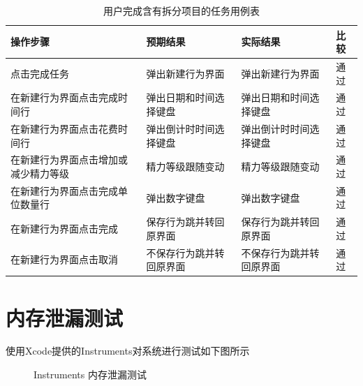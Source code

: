 \begin{table}[H]
	\centering
	\caption{用户完成含有拆分项目的任务用例表}
	\begin{tabular}{p{3cm}p{3cm}p{3cm}p{3cm}} \toprule
	  操作步骤 & 预期结果 & 实际结果 & 比较 \\
	  \midrule
	  点击完成任务 & 弹出新建行为界面 & 弹出新建行为界面 & 通过 \\ \midrule
	  在新建行为界面点击完成时间行 & 弹出日期和时间选择键盘 & 弹出日期和时间选择键盘 & 通过 \\ \midrule
	  在新建行为界面点击花费时间行 & 弹出倒计时时间选择键盘 & 弹出倒计时时间选择键盘 & 通过 \\ \midrule
	  在新建行为界面点击增加或减少精力等级 & 精力等级跟随变动 & 精力等级跟随变动 & 通过 \\ \midrule
	  在新建行为界面点击完成单位数量行 & 弹出数字键盘 & 弹出数字键盘 & 通过 \\ \midrule
	  在新建行为界面点击完成 & 保存行为跳并转回原界面 & 保存行为跳并转回原界面 & 通过 \\ \midrule
	  在新建行为界面点击取消 & 不保存行为跳并转回原界面 & 不保存行为跳并转回原界面 & 通过 \\ \midrule
	  \bottomrule
	\end{tabular}
\end{table}

\section{内存泄漏测试}
使用Xcode提供的Instruments对系统进行测试如下图所示
\begin{figure}[H]
	\centering
	\caption{Instruments 内存泄漏测试}
\end{figure}